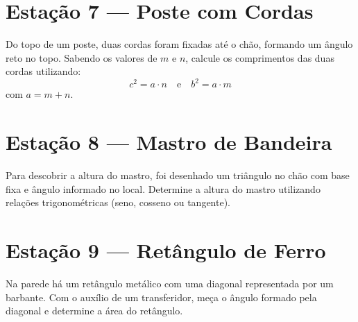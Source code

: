 \documentclass[12pt]{article}
\begin{document}
	\section*{Estação 7 — Poste com Cordas}
	Do topo de um poste, duas cordas foram fixadas até o chão, formando um ângulo reto no topo. Sabendo os valores de $m$ e $n$, calcule os comprimentos das duas cordas utilizando:
	\[
	c^2 = a \cdot n \quad \text{e} \quad b^2 = a \cdot m
	\]
	com $a = m + n$.
	
	\section*{Estação 8 — Mastro de Bandeira}
	Para descobrir a altura do mastro, foi desenhado um triângulo no chão com base fixa e ângulo informado no local. Determine a altura do mastro utilizando relações trigonométricas (seno, cosseno ou tangente).
	
	\section*{Estação 9 — Retângulo de Ferro}
	Na parede há um retângulo metálico com uma diagonal representada por um barbante. Com o auxílio de um transferidor, meça o ângulo formado pela diagonal e determine a área do retângulo.
	
\end{document}
